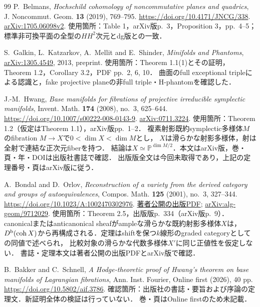 \documentclass[11pt,a4paper]{ltjsarticle}
\begin{document}
\begin{thebibliography}{99}
 P.~Belmans,
\emph{Hochschild cohomology of noncommutative planes and quadrics},
J. Noncommut. Geom. \textbf{13} (2019), 769--795.
\url{https://doi.org/10.4171/JNCG/338}.
\href{https://arxiv.org/abs/1705.06098v2}{arXiv:1705.06098v2}.
使用箇所：Table 1，arXiv版p.~3，Proposition 3，pp.~4--5；標準非可換平面の全型の$HH^2$次元とdg版との一致．

 S.~Galkin, L.~Katzarkov, A.~Mellit and E.~Shinder,
\emph{Minifolds and Phantoms},
\href{https://arxiv.org/abs/1305.4549}{arXiv:1305.4549}, 2013, preprint.
使用箇所：Theorem 1.1(1)とその証明，Theorem 1.2，Corollary 3.2，PDF pp.~2, 6, 10．
曲面のfull exceptional tripleによる認識と，fake projective planeの非full triple・H-phantomを確認した．

 J.-M.~Hwang,
\emph{Base manifolds for fibrations of projective irreducible symplectic manifolds},
Invent. Math. \textbf{174} (2008), no.~3, 625--644.
\url{https://doi.org/10.1007/s00222-008-0143-9}.
\href{https://arxiv.org/abs/0711.3224}{arXiv:0711.3224}.
使用箇所：Theorem 1.2（仮定はTheorem 1.1），arXiv版pp.~1--2．
複素射影既約symplectic多様体$M$のfibration $M\to X$で$0<\dim X<\dim M$とし，
$X$は滑らかな射影多様体，射は全射で連結な正次元fiberを持つ．
結論は$X\simeq\mathbb P^{\dim M/2}$．本文はarXiv版，巻・頁・年・DOIは出版社書誌で確認．
出版版全文は今回未取得であり，上記の定理番号・頁はarXiv版に従う．

 A.~Bondal and D.~Orlov,
\emph{Reconstruction of a variety from the derived category and groups of autoequivalences},
Compos. Math. \textbf{125} (2001), no.~3, 327--344.
\url{https://doi.org/10.1023/A:1002470302976}.
\href{https://homepage.mi-ras.ru/~orlov/papers/Compositio2001.pdf}{著者公開の出版PDF};
\href{https://arxiv.org/abs/alg-geom/9712029}{arXiv:alg-geom/9712029}.
使用箇所：Theorem 2.5，出版版p.~334（arXiv版p.~9）．
canonicalまたはanticanonical sheafがampleな滑らかな既約射影多様体$X$は，
$D^{\mathrm b}(\operatorname{coh} X)$から再構成される．定理はshiftを保つ$k$線形のgraded categoryとしての同値で述べられ，
比較対象の滑らかな代数多様体$X'$に同じ正値性を仮定しない．
書誌・定理本文は著者公開の出版PDFとarXiv版で確認．

 B.~Bakker and C.~Schnell,
\emph{A Hodge-theoretic proof of Hwang's theorem on base manifolds of Lagrangian fibrations},
Ann. Inst. Fourier, Online first (2026), 40 pp.
\url{https://doi.org/10.5802/aif.3786}.
確認箇所：出版社の書誌・要旨および序論の定理文．新証明全体の検証は行っていない．
巻・頁はOnline firstのため未記載．

\end{thebibliography}
\end{document}
